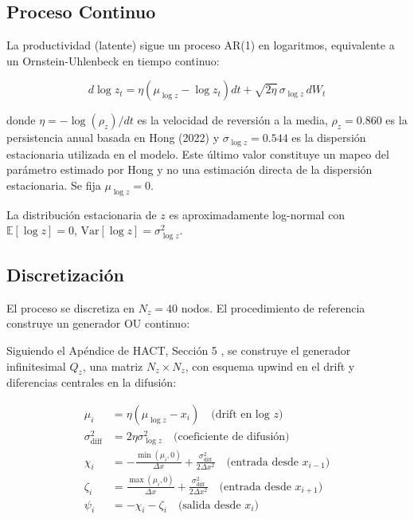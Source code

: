 \documentclass[12pt]{article}
\newcommand{\E}{\mathbb{E}}
\begin{document}
\subsection{Proceso Continuo}

La productividad (latente) sigue un proceso AR(1) en logaritmos, equivalente a un Ornstein-Uhlenbeck en tiempo continuo:

\begin{equation}\label{eq:ou}
d \log z_t = \eta (\mu_{\log z} - \log z_t) dt + \sqrt{2\eta}\,\sigma_{\log z}\, dW_t
\end{equation}

donde $\eta=-\log(\rho_z)/dt$ es la velocidad de reversión a la media, $\rho_z=0.860$ es la persistencia anual basada en Hong (2022) y $\sigma_{\log z}=0.544$ es la dispersión estacionaria utilizada en el modelo. Este último valor constituye un mapeo del parámetro estimado por Hong y no una estimación directa de la dispersión estacionaria. Se fija $\mu_{\log z}=0$.

La distribución estacionaria de $z$ es aproximadamente log-normal con $\E[\log z]=0$, $\text{Var}[\log z] = \sigma_{\log z}^2$.

\subsection{Discretización}

El proceso se discretiza en $N_z=40$ nodos. El procedimiento de referencia construye un generador OU continuo:

Siguiendo el Apéndice de HACT, Sección 5 \cite{hact_appendix}, se construye el generador infinitesimal $Q_z$, una matriz $N_z\times N_z$, con esquema upwind en el drift y diferencias centrales en la difusión:

\begin{equation}\label{eq:Qz_construction}
\begin{aligned}
\mu_i &= \eta(\mu_{\log z} - x_i) \quad \text{(drift en log $z$)} \\
\sigma^2_{\text{diff}} &= 2\eta\sigma_{\log z}^2 \quad \text{(coeficiente de difusión)} \\
\chi_i &= -\frac{\min(\mu_i,0)}{\Delta x} + \frac{\sigma^2_{\text{diff}}}{2\Delta x^2} \quad \text{(entrada desde $x_{i-1}$)} \\
\zeta_i &= \frac{\max(\mu_i,0)}{\Delta x} + \frac{\sigma^2_{\text{diff}}}{2\Delta x^2} \quad \text{(entrada desde $x_{i+1}$)} \\
\psi_i &= -\chi_i - \zeta_i \quad \text{(salida desde $x_i$)}
\end{aligned}
\end{equation}
\end{document}
